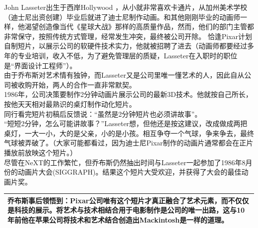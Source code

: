 John Lasseter出生于西岸Hollywood
，从小就非常喜欢卡通片，从加州美术学校（迪士尼出资创建）毕业后就进了迪士尼制作动画。和其他刚刚毕业的动画师一样，他渴望创造像当代《星球大战》那样的高质量作品，然而，他们的部门主管都非常保守，按照传统方式管理，经常发生冲突，最终被公司开除。
恰逢Pixar计划自制短片，以展示公司的软硬件技术实力，他就被招聘了进去（动画师都要经过多年的专业培训，收入不低，为了避免管理层的质疑，Lasseter在入职时的职位是``界面设计工程师''）。\\
由于乔布斯对艺术情有独钟，而Lasseter又是公司里唯一懂艺术的人，因此自从公司被收购开始，两人的合作一直非常默契。\\
1986年，公司决策要制作2分钟动画片展示公司的最新3D技术。他就按自己所长，按他天天相对最熟识的桌灯制作动化短片。\\
同行看完短片初稿后反馈说：``虽然是2分钟短片也必须讲故事''。\\
``短短2分钟，怎么可能讲故事？''Lasseter想，但他还是按这建议，改成做成两把桌灯，一大一小，大的是父亲，小的是小孩。相互争夺一个气球，争来争去，最终气球被弄破了。（大家可能都看过，因为迪士尼Pixar制作的动画片通常都会在正片播放前放映这个短片。）\\
尽管在NeXT的工作繁忙，但乔布斯仍然抽出时间与Lasseter一起参加了1986年8月份的动画片大会(SIGGRAPH)。结果这个短片大受欢迎，并获得了大会的最佳动画片奖。

\begin{longtable}[]{@{}l@{}}
\toprule
\endhead
乔布斯事后领悟到：Pixar公司唯有这个短片才真正融合了艺术元素，而不仅仅是科技的展示。将艺术与技术相结合用于电影制作是公司的唯一出路，这与10年前他在苹果公司将技术和艺术结合创造出Mackintosh是一样的道理。\tabularnewline
\bottomrule
\end{longtable}

